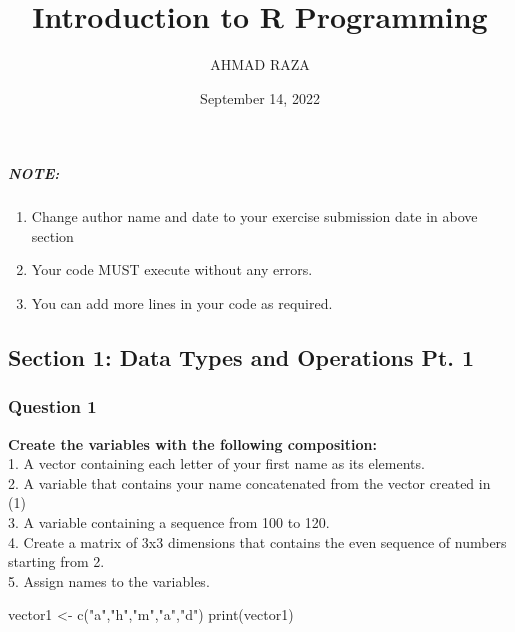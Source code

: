 \documentclass[
]{article}
\title{Introduction to R Programming}
\author{AHMAD RAZA}
\date{September 14, 2022}
\newenvironment{Shaded}{\begin{snugshade}}{\end{snugshade}}
\newcommand{\FunctionTok}[1]{\textcolor[rgb]{0.00,0.00,0.00}{#1}}
\newcommand{\NormalTok}[1]{#1}
\newcommand{\OtherTok}[1]{\textcolor[rgb]{0.56,0.35,0.01}{#1}}
\newcommand{\StringTok}[1]{\textcolor[rgb]{0.31,0.60,0.02}{#1}}
\providecommand{\tightlist}{%
  \setlength{\itemsep}{0pt}\setlength{\parskip}{0pt}}
\begin{document}
\maketitle

\hypertarget{note}{%
\subparagraph{NOTE:}\label{note}}

\begin{enumerate}
\def\labelenumi{\arabic{enumi}.}
\tightlist
\item
  Change author name and date to your exercise submission date in above
  section
\item
  Your code MUST execute without any errors.
\item
  You can add more lines in your code as required.
\end{enumerate}

\hypertarget{section-1-data-types-and-operations-pt.-1}{%
\subsection{Section 1: Data Types and Operations Pt.
1}\label{section-1-data-types-and-operations-pt.-1}}

\hypertarget{question-1}{%
\subsubsection{Question 1}\label{question-1}}

\textbf{Create the variables with the following composition:}\\
1. A vector containing each letter of your first name as its elements.\\
2. A variable that contains your name concatenated from the vector
created in (1)\\
3. A variable containing a sequence from 100 to 120.\\
4. Create a matrix of 3x3 dimensions that contains the even sequence of
numbers starting from 2.\\
5. Assign names to the variables.

\begin{Shaded}
\begin{Highlighting}[]
\NormalTok{vector1 }\OtherTok{\textless{}{-}} \FunctionTok{c}\NormalTok{(}\StringTok{"a"}\NormalTok{,}\StringTok{"h"}\NormalTok{,}\StringTok{"m"}\NormalTok{,}\StringTok{"a"}\NormalTok{,}\StringTok{"d"}\NormalTok{)}
\FunctionTok{print}\NormalTok{(vector1)}
\end{Highlighting}
\end{Shaded}
\end{document}
